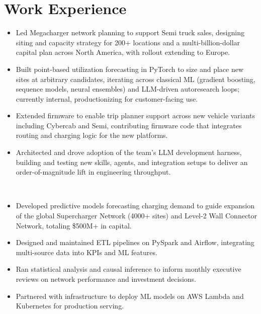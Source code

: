 \documentclass[12pt,a4paper,roman]{moderncv}
\begin{document}
\makecvtitle

\section{Work Experience}

\begin{itemize}
\item Led Megacharger network planning to support Semi truck sales, designing siting and capacity strategy for 200+ locations and a multi-billion-dollar capital plan across North America, with rollout extending to Europe.
\item Built point-based utilization forecasting in PyTorch to size and place new sites at arbitrary candidates, iterating across classical ML (gradient boosting, sequence models, neural ensembles) and LLM-driven autoresearch loops; currently internal, productionizing for customer-facing use.
\item Extended firmware to enable trip planner support across new vehicle variants including Cybercab and Semi, contributing firmware code that integrates routing and charging logic for the new platforms.
\item Architected and drove adoption of the team's LLM development harness, building and testing new skills, agents, and integration setups to deliver an order-of-magnitude lift in engineering throughput.

\hspace*{\fill} \\
\end{itemize}

\begin{itemize}
\item Developed predictive models forecasting charging demand to guide expansion of the global Supercharger Network (4000+ sites) and Level-2 Wall Connector Network, totaling \$500M+ in capital.
\item Designed and maintained ETL pipelines on PySpark and Airflow, integrating multi-source data into KPIs and ML features.
\item Ran statistical analysis and causal inference to inform monthly executive reviews on network performance and investment decisions.
\item Partnered with infrastructure to deploy ML models on AWS Lambda and Kubernetes for production serving.

\hspace*{\fill} \\
\end{itemize}
\end{document}
